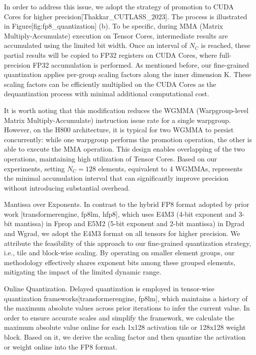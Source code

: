\documentclass[11pt,a4paper]{article}
\begin{document}
In order to address this issue, we adopt the strategy of promotion to CUDA Cores for higher precision[Thakkar\_CUTLASS\_2023]. The process is illustrated in Figure[fig:fp8\_quantization] (b). To be specific, during MMA (Matrix Multiply-Accumulate) execution on Tensor Cores, intermediate results are accumulated using the limited bit width. Once an interval of $N_C$ is reached, these partial results will be copied to FP32 registers on CUDA Cores, where full-precision FP32 accumulation is performed. As mentioned before, our fine-grained quantization applies per-group scaling factors along the inner dimension K. These scaling factors can be efficiently multiplied on the CUDA Cores as the dequantization process with minimal additional computational cost.

It is worth noting that this modification reduces the WGMMA (Warpgroup-level Matrix Multiply-Accumulate) instruction issue rate for a single warpgroup. However, on the H800 architecture, it is typical for two WGMMA to persist concurrently: while one warpgroup performs the promotion operation, the other is able to execute the MMA operation. This design enables overlapping of the two operations, maintaining high utilization of Tensor Cores. Based on our experiments, setting $N_C=128$ elements, equivalent to 4 WGMMAs, represents the minimal accumulation interval that can significantly improve precision without introducing substantial overhead.

Mantissa over Exponents. In contrast to the hybrid FP8 format adopted by prior work [transformerengine, fp8lm, hfp8], which uses E4M3 (4-bit exponent and 3-bit mantissa) in Fprop and E5M2 (5-bit exponent and 2-bit mantissa) in Dgrad and Wgrad, we adopt the E4M3 format on all tensors for higher precision. We attribute the feasibility of this approach to our fine-grained quantization strategy, i.e., tile and block-wise scaling. By operating on smaller element groups, our methodology effectively shares exponent bits among these grouped elements, mitigating the impact of the limited dynamic range.

Online Quantization. Delayed quantization is employed in tensor-wise quantization frameworks[transformerengine, fp8lm], which maintains a history of the maximum absolute values across prior iterations to infer the current value. In order to ensure accurate scales and simplify the framework, we calculate the maximum absolute value online for each 1x128 activation tile or 128x128 weight block. Based on it, we derive the scaling factor and then quantize the activation or weight online into the FP8 format.
\end{document}
